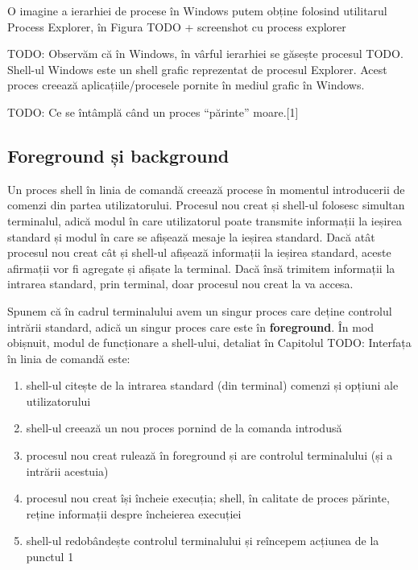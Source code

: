 O imagine a ierarhiei de procese în Windows putem obține folosind utilitarul
Process Explorer, în Figura TODO + screenshot cu process explorer

TODO: Observăm că în Windows, în vârful ierarhiei se găsește procesul TODO.
Shell-ul Windows este un shell grafic reprezentat de procesul Explorer. Acest
proces creează aplicațiile/procesele pornite în mediul grafic în Windows.

TODO: Ce se întâmplă când un proces “părinte” moare.[1]

\subsection{Foreground și background}
\label{sec:procese-ierarhie-foreground-background}

Un proces shell în linia de comandă creează procese în momentul introducerii de
comenzi din partea utilizatorului. Procesul nou creat și shell-ul folosesc
simultan terminalul, adică modul în care utilizatorul poate transmite informații
la ieșirea standard și modul în care se afișează mesaje la ieșirea standard.
Dacă atât procesul nou creat cât și shell-ul afișează informații la ieșirea
standard, aceste afirmații vor fi agregate și afișate la terminal. Dacă însă
trimitem informații la intrarea standard, prin terminal, doar procesul nou creat
la va accesa.

Spunem că în cadrul terminalului avem un singur proces care deține controlul
intrării standard, adică un singur proces care este în \textbf{foreground}. În mod
obișnuit, modul de funcționare a shell-ului, detaliat în Capitolul TODO:
Interfața în linia de comandă este:

\begin{enumerate}
	\item shell-ul citește de la intrarea standard (din terminal) comenzi și
		opțiuni ale utilizatorului
	\item shell-ul creează un nou proces pornind de la comanda introdusă
	\item procesul nou creat rulează în foreground și are controlul
		terminalului (și a intrării acestuia)
	\item procesul nou creat își încheie execuția; shell, în calitate de
		proces părinte, reține informații despre încheierea execuției
	\item shell-ul redobândește controlul terminalului și reîncepem acțiunea
		de la punctul 1
\end{enumerate}

